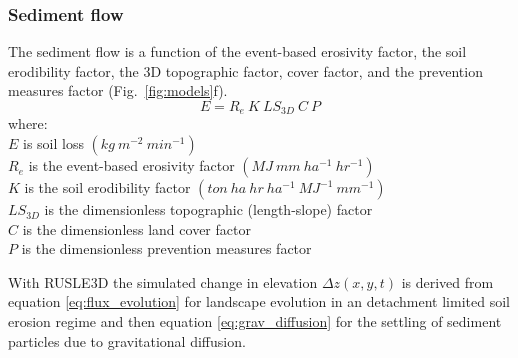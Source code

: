 \documentclass[esurf, manuscript]{copernicus}
\begin{document}
\subsubsection{Sediment flow}

The sediment flow is a function of the event-based erosivity factor, 
the soil erodibility factor, the 3D topographic factor, cover factor, and the prevention measures factor 
(Fig.~\ref{fig:models}f). %
%
\begin{equation}
\label{eq:rusle}
{E = R_e ~ K ~ LS_{3D} ~ C ~ P}
\end{equation}
%
{\small
\noindent
where: \\
\noindent
\hspace*{0.5em} $E$ is soil loss $(kg ~ m^{-2} ~ min^{-1})$\\
\hspace*{0.5em} $R_e$ is the event-based erosivity factor $(MJ ~ mm ~ ha^{-1} ~ hr^{-1})$\\ %
\hspace*{0.5em} $K$ is the soil erodibility factor $(ton ~ ha ~ hr ~ ha^{-1} ~ MJ^{-1} ~ mm^{-1})$\\
\hspace*{0.5em} $LS_{3D}$ is the dimensionless topographic (length-slope) factor\\
\hspace*{0.5em} $C$ is the dimensionless land cover factor\\
\hspace*{0.5em} $P$ is the dimensionless prevention measures factor\\
}

With RUSLE3D the simulated change in elevation $\Delta z(x,y,t)$
is derived from 
equation \ref{eq:flux_evolution}
for landscape evolution in an detachment limited soil erosion regime
and then equation \ref{eq:grav_diffusion}
for the settling of sediment particles due to gravitational diffusion.


\end{document}

